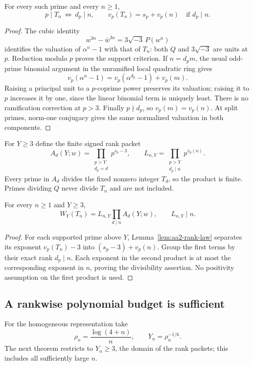 \begin{lemma}
\label{lem:aa2-rank-law}
For every such prime and every $n\ge1$,
\[
 p\mid T_n\ \Longleftrightarrow\ d_p\mid n,
 \qquad
 v_p(T_n)=s_p+v_p(n)\quad\text{if }d_p\mid n.
\]
\end{lemma}
\begin{proof}
The cubic identity
\[
 w^{3n}-\bar w^{3n}=3\sqrt{-3}\,P(w^n)
\]
identifies the valuation of $\alpha^n-1$ with that of $T_n$: both $Q$ and
$3\sqrt{-3}$ are units at $p$. Reduction modulo $p$ proves the support
criterion. If $n=d_pm$, the usual odd-prime binomial argument in the
unramified local quadratic ring gives
\[
 v_p(\alpha^n-1)=v_p(\alpha^{d_p}-1)+v_p(m).
\]
Raising a principal unit to a $p$-coprime power preserves its valuation;
raising it to $p$ increases it by one, since the linear binomial term is
uniquely least. There is no ramification correction at $p>3$. Finally
$p\nmid d_p$, so $v_p(m)=v_p(n)$. At split primes, norm-one conjugacy gives
the same normalized valuation in both components.
\end{proof}

For $Y\ge3$ define the finite signed rank packet
\[
 A_d(Y;w)=\prod_{\substack{p>Y\\d_p=d}}p^{s_p-3},
 \qquad
 L_{n,Y}=\prod_{\substack{p>Y\\d_p\mid n}}p^{v_p(n)}.
\]
Every prime in $A_d$ divides the fixed nonzero integer $T_d$, so the product
is finite. Primes dividing $Q$ never divide $T_n$ and are not included.

\begin{proposition}
\label{prop:aa2-signed-packet}
For every $n\ge1$ and $Y\ge3$,
\begin{equation}\label{eq:aa2-signed-packet}
 \boxed{W_Y(T_n)=L_{n,Y}\prod_{d\mid n}A_d(Y;w),
 \qquad L_{n,Y}\mid n.}
\end{equation}
\end{proposition}
\begin{proof}
For each supported prime above $Y$, Lemma~\ref{lem:aa2-rank-law} separates
its exponent $v_p(T_n)-3$ into $(s_p-3)+v_p(n)$. Group the first terms by
their exact rank $d_p\mid n$. Each exponent in the second product is at most
the corresponding exponent in $n$, proving the divisibility assertion.
No positivity assumption on the first product is used.
\end{proof}

\subsection{A rankwise polynomial budget is sufficient}
For the homogeneous representation take
\[
 \rho_n=\frac{\log(4+n)}n,\qquad Y_n=\rho_n^{-1/6}.
\]
The next theorem restricts to $Y_n\ge3$, the domain of the rank packets;
this includes all sufficiently large $n$.

